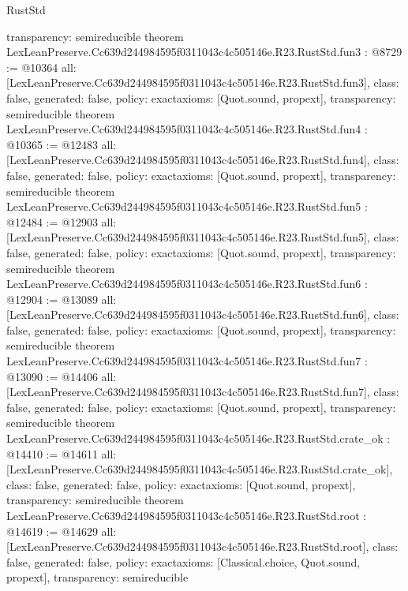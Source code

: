 \begin{lexlean}{RustStd}
\begin{coremodule}
{  transparency: semireducible
}
theorem LexLeanPreserve.Cc639d244984595f0311043c4c505146e.R23.RustStd.fun3 : @8729 := @10364 {
  all: [LexLeanPreserve.Cc639d244984595f0311043c4c505146e.R23.RustStd.fun3],
  class: false,
  generated: false,
  policy: exact{axioms: [Quot.sound, propext]},
  transparency: semireducible
}
theorem LexLeanPreserve.Cc639d244984595f0311043c4c505146e.R23.RustStd.fun4 : @10365 := @12483 {
  all: [LexLeanPreserve.Cc639d244984595f0311043c4c505146e.R23.RustStd.fun4],
  class: false,
  generated: false,
  policy: exact{axioms: [Quot.sound, propext]},
  transparency: semireducible
}
theorem LexLeanPreserve.Cc639d244984595f0311043c4c505146e.R23.RustStd.fun5 : @12484 := @12903 {
  all: [LexLeanPreserve.Cc639d244984595f0311043c4c505146e.R23.RustStd.fun5],
  class: false,
  generated: false,
  policy: exact{axioms: [Quot.sound, propext]},
  transparency: semireducible
}
theorem LexLeanPreserve.Cc639d244984595f0311043c4c505146e.R23.RustStd.fun6 : @12904 := @13089 {
  all: [LexLeanPreserve.Cc639d244984595f0311043c4c505146e.R23.RustStd.fun6],
  class: false,
  generated: false,
  policy: exact{axioms: [Quot.sound, propext]},
  transparency: semireducible
}
theorem LexLeanPreserve.Cc639d244984595f0311043c4c505146e.R23.RustStd.fun7 : @13090 := @14406 {
  all: [LexLeanPreserve.Cc639d244984595f0311043c4c505146e.R23.RustStd.fun7],
  class: false,
  generated: false,
  policy: exact{axioms: [Quot.sound, propext]},
  transparency: semireducible
}
theorem LexLeanPreserve.Cc639d244984595f0311043c4c505146e.R23.RustStd.crate_ok : @14410 := @14611 {
  all: [LexLeanPreserve.Cc639d244984595f0311043c4c505146e.R23.RustStd.crate_ok],
  class: false,
  generated: false,
  policy: exact{axioms: [Quot.sound, propext]},
  transparency: semireducible
}
theorem LexLeanPreserve.Cc639d244984595f0311043c4c505146e.R23.RustStd.root : @14619 := @14629 {
  all: [LexLeanPreserve.Cc639d244984595f0311043c4c505146e.R23.RustStd.root],
  class: false,
  generated: false,
  policy: exact{axioms: [Classical.choice, Quot.sound, propext]},
  transparency: semireducible
}


\end{coremodule}
\end{lexlean}
